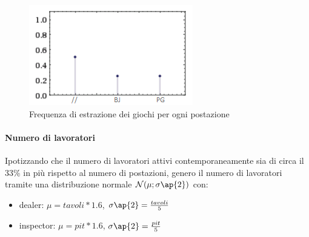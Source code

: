     \begin{figure}[!htb]
        \begin{widepage}
            \centering
            \includegraphics[width=.49\textwidth]{../immagini/distr_giochi_tavoli.png}
            \caption{Frequenza di estrazione dei giochi per ogni postazione}
        \end{widepage}
    \end{figure}%
    \clearpage
    \paragraph{Numero di lavoratori} Ipotizzando che il numero di lavoratori attivi contemporaneamente sia di circa il 33\% in più rispetto al numero di postazioni, genero il numero di lavoratori tramite una distribuzione normale $\mathcal{N}(\mu;\sigma \ap{2})$ con:
    \begin{itemize}
        \item dealer: $\mu = tavoli*1.6$, $\sigma \ap{2} = \frac{tavoli}{5}$
        \item inspector: $\mu = pit*1.6$, $\sigma \ap{2} = \frac{pit}{5}$
    \end{itemize}

